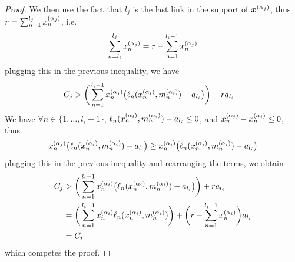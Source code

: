 \begin{proof}
We then use the fact that $l_j$ is the last link in the support of $\boldsymbol {x}^{(\alpha_j)}$, thus $r = \sum_{n = 1}^{l_j} x_n^{(\alpha_j)}$, i.e.
\[
\sum_{n = l_i}^{l_j} x_n^{(\alpha_j)} = r - \sum_{n = 1}^{l_i - 1} x_n^{(\alpha_j)}
\]
plugging this in the previous inequality, we have
\begin{align*}
C_j 
&> \bigg( \sum_{n = 1}^{l_i-1} x_n^{(\alpha_j)} \big( \ell_n(x_n^{(\alpha_i)}, m_n^{(\alpha_i)}) - a_{l_i} \big) \bigg)+ r a_{l_i}
\end{align*}
We have $\forall n \in \{1, \dots, l_i - 1\}$, $\ell_n(x_n^{(\alpha_i)}, m_n^{(\alpha_i)}) - a_{l_i} \leq 0$, and $x_n^{(\alpha_j)} - x_n^{(\alpha_i)} \leq 0$, thus
\[
x_n^{(\alpha_j)} \big( \ell_n(x_n^{(\alpha_i)}, m_n^{(\alpha_i)}) - a_{l_i} \big) \geq 
x_n^{(\alpha_i)} \big( \ell_n(x_n^{(\alpha_i)}, m_n^{(\alpha_i)}) - a_{l_i} \big)
\]
plugging this in the previous inequality and rearranging the terms, we obtain
\begin{align*}
C_j 
&> \bigg( \sum_{n = 1}^{l_i-1} x_n^{(\alpha_i)} \big( \ell_n(x_n^{(\alpha_i)}, m_n^{(\alpha_i)}) - a_{l_i} \big) \bigg)+ r a_{l_i} \\
&= \bigg( \sum_{n = 1}^{l_i-1} x_n^{(\alpha_i)} \ell_n(x_n^{(\alpha_i)}, m_n^{(\alpha_i)}) \bigg)+ \bigg( r - \sum_{n = 1}^{l_i-1} x_n^{(\alpha_i)} \bigg) a_{l_i} \\
&= C_i
\end{align*}
which competes the proof.
\end{proof}